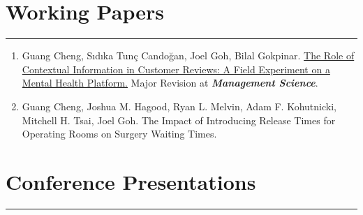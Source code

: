 \documentclass[12pt, a4paper]{article}
\begin{document}
{\section*{Working Papers}
\vspace*{4pt}
\hrule

\begin{enumerate}[leftmargin=30pt, resume]
	
	\item Guang Cheng, S\i{}d\i{}ka Tun\c{c} Cando\u{g}an, Joel Goh, Bilal Gokpinar.
	\href{https://ssrn.com/abstract=4956298}{The Role of Contextual Information in Customer Reviews: A Field Experiment on a Mental Health Platform.} Major Revision at \textit{\textbf{Management Science}}.

	\item Guang Cheng, Joshua M. Hagood, Ryan L. Melvin, Adam F. Kohutnicki, Mitchell H. Tsai, Joel Goh. The Impact of Introducing Release Times for Operating Rooms on Surgery Waiting Times.

\end{enumerate}






	





\section*{Conference Presentations}
\vspace*{4pt}
\hrule

}
\end{document}
